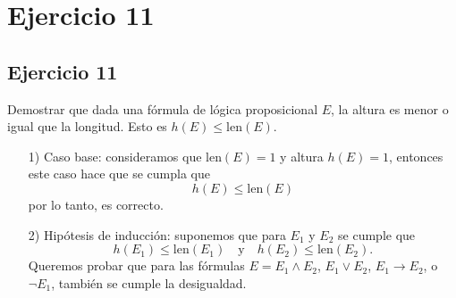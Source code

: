 \chapter*{Ejercicio 11}
\section*{Ejercicio 11}

Demostrar que dada una fórmula de lógica proposicional $E$, la altura es menor o igual que la longitud. Esto es $h(E) \leq \text{len}(E)$. \\

\begin{enumerate}
    \item[1)] Caso base: consideramos que $\text{len}(E) = 1$ y altura $h(E) = 1$, entonces este caso hace que se cumpla que
    \[
    h(E) \leq \text{len}(E)
    \]
    por lo tanto, es correcto.

    \item[2)] Hipótesis de inducción: suponemos que para $E_1$ y $E_2$ se cumple que
    \[
    h(E_1) \leq \text{len}(E_1) \quad \text{y} \quad h(E_2) \leq \text{len}(E_2).
    \]
    Queremos probar que para las fórmulas $E = E_1 \land E_2$, $E_1 \lor E_2$, $E_1 \rightarrow E_2$, o $\neg E_1$, también se cumple la desigualdad.


\end{enumerate}
